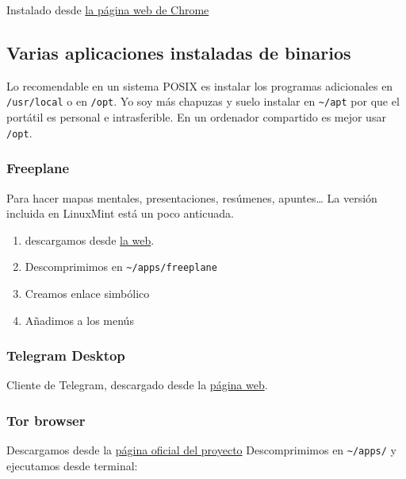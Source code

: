 \documentclass[
  12pt,
  spanish,
]{article}
\providecommand{\tightlist}{%
  \setlength{\itemsep}{0pt}\setlength{\parskip}{0pt}}
\begin{document}
Instalado desde \href{https://www.google.com/chrome/}{la página web de
Chrome}

\hypertarget{varias-aplicaciones-instaladas-de-binarios}{%
\subsection{Varias aplicaciones instaladas de
binarios}\label{varias-aplicaciones-instaladas-de-binarios}}

Lo recomendable en un sistema POSIX es instalar los programas
adicionales en \texttt{/usr/local} o en \texttt{/opt}. Yo soy más
chapuzas y suelo instalar en \texttt{\textasciitilde{}/apt} por que el
portátil es personal e intrasferible. En un ordenador compartido es
mejor usar \texttt{/opt}.

\hypertarget{freeplane}{%
\subsubsection{Freeplane}\label{freeplane}}

Para hacer mapas mentales, presentaciones, resúmenes, apuntes\ldots{} La
versión incluida en LinuxMint está un poco anticuada.

\begin{enumerate}
\def\labelenumi{\arabic{enumi}.}
\tightlist
\item
  descargamos desde
  \href{http://freeplane.sourceforge.net/wiki/index.php/Home}{la web}.
\item
  Descomprimimos en \texttt{\textasciitilde{}/apps/freeplane}
\item
  Creamos enlace simbólico
\item
  Añadimos a los menús
\end{enumerate}

\hypertarget{telegram-desktop}{%
\subsubsection{Telegram Desktop}\label{telegram-desktop}}

Cliente de Telegram, descargado desde la
\href{https://desktop.telegram.org/}{página web}.

\hypertarget{tor-browser}{%
\subsubsection{Tor browser}\label{tor-browser}}

Descargamos desde la \href{https://www.torproject.org/}{página oficial
del proyecto} Descomprimimos en \texttt{\textasciitilde{}/apps/} y
ejecutamos desde terminal:
\end{document}
